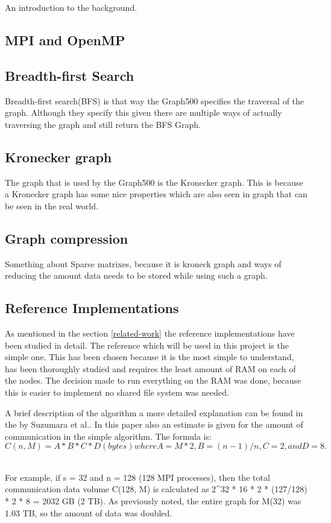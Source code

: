 An introduction to the background.
\subsection{MPI and OpenMP}

\subsection{Breadth-first Search}
Breadth-first search(BFS) is that way the Graph500 specifies the traversal of the graph. Although they specify this given there are multiple ways of actually traversing the graph and still return the BFS Graph.


\subsection{Kronecker graph}
The graph that is used by the Graph500 is the Kronecker graph\cite{leskovec2010kronecker}. This is because a Kronecker graph has some nice properties which are also seen in graph that can be seen in the real world.

\subsection{Graph compression}
Something about Sparse matrixes, because it is kroneck graph and ways of reducing the amount data needs to be stored while using such a graph.

\subsection{Reference Implementations}
As mentioned in the section \ref{related-work} the reference implementations have been studied in detail. The reference which will be used in this project is the 
simple one. This has been chosen because it is the most simple to understand, has been thoroughly studied and requires the least amount of RAM on each of the nodes. The decision made to run everything on the RAM was done, because this is easier to implement no shared file system was needed. 

A brief description of the algorithm a more detailed explanation can be found in the by Suzumara et al.\cite{suzumura2011performance}.
In this paper also an estimate is given for the amount of communication in the simple algorithm. The formula is:\\
\begin{math}
C(n, M) = A * B * C * D (bytes)  where A = M*2, B = (n-1)/n, C=2, and D=8.  
\end{math}

\\
For example, if s = 32 and n = 128 (128 MPI processes), 
then the total communication 
data volume C(128, M) is calculated as 2^32 * 16 * 2 * (127/128) * 2 * 8 = 2032 GB (2 TB). As previously noted, the entire graph for M(32) was 
1.03 TB, so the amount of data was doubled.  

